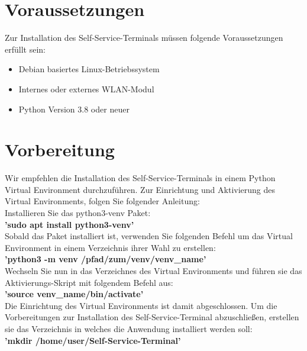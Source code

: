 \section{Voraussetzungen}
Zur Installation des Self-Service-Terminals müssen folgende Voraussetzungen erfüllt sein:
\begin{itemize}
    \item Debian basiertes Linux-Betriebssystem
    \item Internes oder externes WLAN-Modul
    \item Python Version 3.8 oder neuer
\end{itemize}

\section{Vorbereitung}
Wir empfehlen die Installation des Self-Service-Terminals in einem Python Virtual Environment durchzuführen. Zur Einrichtung und Aktivierung des Virtual Environments, folgen Sie folgender Anleitung:\\

\noindent Installieren Sie das python3-venv Paket:\\

\textbf{’sudo apt install python3-venv’}\\

\noindent Sobald das Paket installiert ist, verwenden Sie folgenden Befehl um das Virtual Environment in einem Verzeichnis ihrer Wahl zu erstellen:\\

\textbf{’python3 -m venv /pfad/zum/venv/venv\_name’}\\

\noindent Wechseln Sie nun in das Verzeichnes des Virtual Environments und führen sie das Aktivierungs-Skript mit folgendem Befehl aus:\\

\textbf{’source venv\_name/bin/activate’}\\

Die Einrichtung des Virtual Environments ist damit abgeschlossen.
Um die Vorbereitungen zur Installation des Self-Service-Terminal abzuschließen, erstellen sie das Verzeichnis in welches die Anwendung installiert werden soll:\\

\textbf{’mkdir /home/{user}/Self-Service-Terminal’}\\



